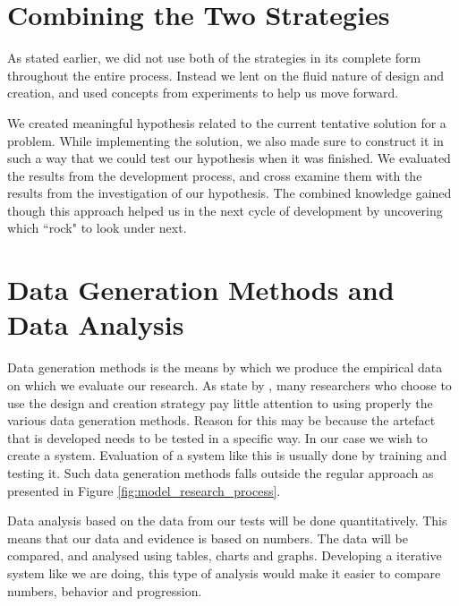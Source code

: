 \section{Combining the Two Strategies}
\label{sec:combining_the_two_strategies}
As stated earlier, we did not use both of the strategies in its complete form throughout the entire process. Instead we lent on the fluid nature of design and creation, and used concepts from experiments to help us move forward. 

We created meaningful hypothesis related to the current tentative solution for a problem. While implementing the solution, we also made sure to construct it in such a way that we could test our hypothesis when it was finished. We evaluated the results from the development process, and cross examine them with the results from the investigation of our hypothesis. The combined knowledge gained though this approach helped us in the next cycle of development by uncovering which ``rock" to look under next.


\section{Data Generation Methods and Data Analysis}
\label{sec:data_generation_methods_and_data_analysis}
Data generation methods is the means by which we produce the empirical data on which we evaluate our research. As state by \citep{oates2005researching}, many researchers who choose to use the design and creation strategy pay little attention to using properly the various data generation methods. Reason for this may be because the artefact that is developed needs to be tested in a specific way. In our case we wish to create a system. Evaluation of a system like this is usually done by training and testing it. Such data generation methods falls outside the regular approach as presented in Figure \ref{fig:model_research_process}.

Data analysis based on the data from our tests will be done quantitatively. This means that our data and evidence is based on numbers. The data will be compared, and analysed using tables, charts and graphs. Developing a iterative system like we are doing, this type of analysis would make it easier to compare numbers, behavior and progression.